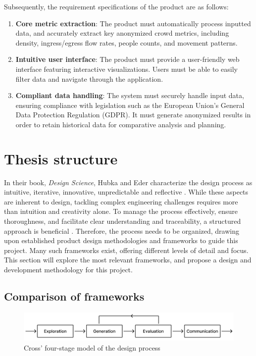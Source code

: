 Subsequently, the requirement specifications of the product are as follows:
\begin{enumerate}
  \item \textbf{Core metric extraction}: The product must automatically process inputted data, and accurately extract key anonymized crowd metrics, including density, ingress/egress flow rates, people counts, and movement patterns.

  \item \textbf{Intuitive user interface}: The product must provide a user-friendly web interface featuring interactive visualizations. Users must be able to easily filter data and navigate through the application.

  \item \textbf{Compliant data handling}: The system must securely handle input data, ensuring compliance with legislation such as the European Union's General Data Protection Regulation (GDPR). It must generate anonymized results in order to retain historical data for comparative analysis and planning.
\end{enumerate}


\section{Thesis structure}

In their book, \textit{Design Science}, Hubka and Eder characterize the design process as intuitive, iterative, innovative, unpredictable and reflective \cite{hubka_eder}. While these aspects are inherent to design, tackling complex engineering challenges requires more than intuition and creativity alone. To manage the process effectively, ensure thoroughness, and facilitate clear understanding and traceability, a structured approach is beneficial \cite{eder}. Therefore, the process needs to be organized, drawing upon established product design methodologies and frameworks to guide this project. Many such frameworks exist, offering different levels of detail and focus. This section will explore the most relevant frameworks, and propose a design and development methodology for this project.

\subsection{Comparison of frameworks}
\vspace{2em}
\begin{figure}[htb!]
  \centering
  \includegraphics[width=\textwidth]{Pictures/Figures/cross.png}
  \caption{Cross' four-stage model of the design process}
  \label{fig:cross}
\end{figure}


